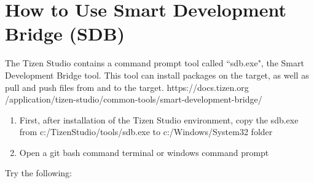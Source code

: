 \documentclass[12pt, a4paper]{article}
\begin{document}
\section{How to Use Smart Development Bridge (SDB)}

The Tizen Studio contains a command prompt tool called ``sdb.exe", the Smart Development Bridge tool. This tool can install packages on the target, as well as pull and push files from and to the target.
https://docs.tizen.org        /application/tizen-studio/common-tools/smart-development-bridge/

\begin{enumerate}
    \item First, after installation of the Tizen Studio environment, copy the sdb.exe from c:/TizenStudio/tools/sdb.exe to c:/Windows/System32 folder
    \item Open a git bash command terminal or windows command prompt
\end{enumerate}
Try the following:
\end{document}
